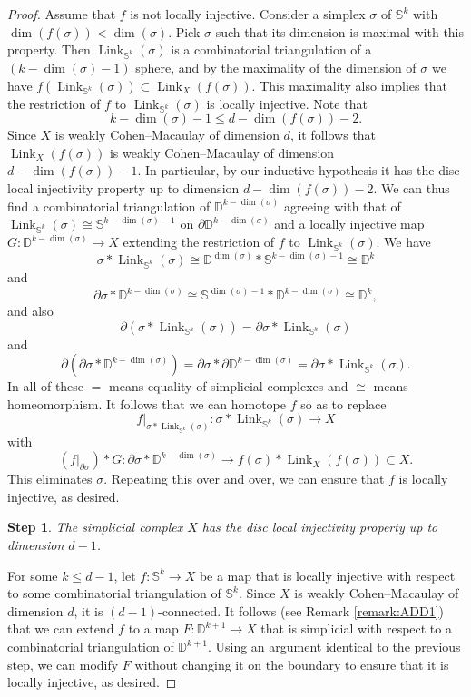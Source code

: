 \documentclass[11pt]{amsart}
\numberwithin{equation}{section}
\theoremstyle{plain}
\newtheorem{stepsb}{Step}
\theoremstyle{definition}
\theoremstyle{remark}
\newcommand\bbD{\ensuremath{\mathbb{D}}}
\newcommand\bbS{\ensuremath{\mathbb{S}}}
\DeclareMathOperator{\Link}{Link}
\begin{document}
\begin{proof}
Assume that $f$ is not locally injective.
Consider a simplex $\sigma$ of $\bbS^k$ with $\dim(f(\sigma)) < \dim(\sigma)$.  Pick $\sigma$ such that its dimension is maximal
with this property.  Then $\Link_{\bbS^k}(\sigma)$ is a combinatorial
triangulation of a $(k-\dim(\sigma)-1)$ sphere, and by the maximality of the dimension of $\sigma$ we have
$f(\Link_{\bbS^k}(\sigma)) \subset \Link_X(f(\sigma))$.  This maximality also implies that the restriction
of $f$ to $\Link_{\bbS^k}(\sigma)$ is locally injective.  Note that
\[k-\dim(\sigma)-1 \leq d - \dim(f(\sigma)) - 2.\]
Since $X$ is weakly Cohen--Macaulay of dimension $d$, it follows that $\Link_X(f(\sigma))$ is weakly
Cohen--Macaulay of dimension $d-\dim(f(\sigma))-1$.  In particular, by our inductive hypothesis
it has the disc local injectivity property up to dimension $d-\dim(f(\sigma))-2$.  We can thus
find a combinatorial triangulation of $\bbD^{k-\dim(\sigma)}$ agreeing with that of $\Link_{\bbS^k}(\sigma) \cong \bbS^{k-\dim(\sigma)-1}$ on
$\partial \bbD^{k-\dim(\sigma)}$ and a locally injective map $G\colon \bbD^{k-\dim(\sigma)} \rightarrow X$
extending the restriction of $f$ to $\Link_{\bbS^k}(\sigma)$.  We have
\[\sigma \ast \Link_{\bbS^k}\left(\sigma\right) \cong \bbD^{\dim(\sigma)} \ast \bbS^{k-\dim(\sigma)-1} \cong \bbD^k\]
and
\[\partial \sigma \ast \bbD^{k-\dim(\sigma)} \cong \bbS^{\dim(\sigma)-1} \ast \bbD^{k-\dim(\sigma)} \cong \bbD^k,\]
and also
\[\partial\left(\sigma \ast \Link_{\bbS^k}\left(\sigma\right)\right) = \partial \sigma \ast \Link_{\bbS^k}\left(\sigma\right)\]
and
\[\partial\left(\partial \sigma \ast \bbD^{k-\dim(\sigma)}\right) = \partial \sigma \ast \partial \bbD^{k-\dim(\sigma)} = \partial \sigma \ast \Link_{\bbS^k}(\sigma).\]
In all of these $=$ means equality of simplicial complexes and $\cong$ means homeomorphism.  It follows that we can homotope
$f$ so as to replace
\[f|_{\sigma \ast \Link_{\bbS^k}(\sigma)} \colon \sigma \ast \Link_{\bbS^k}(\sigma) \rightarrow X\]
with
\[\left(f|_{\partial \sigma}\right) \ast G \colon \partial \sigma \ast \bbD^{k-\dim(\sigma)} \rightarrow f(\sigma) \ast \Link_X(f(\sigma)) \subset X.\]
This eliminates $\sigma$. 
Repeating this over and over, we can ensure that $f$ is locally injective, as desired.

\begin{stepsb}
The simplicial complex $X$ has the disc local injectivity property up to dimension $d-1$.
\end{stepsb}

For some $k \leq d-1$, let $f\colon \bbS^k \rightarrow X$ be a map that is locally injective with respect
to some combinatorial triangulation of $\bbS^k$.  Since $X$ is weakly Cohen--Macaulay of dimension $d$, it
is $(d-1)$-connected.  It follows (see Remark \ref{remark:ADD1}) 
that we can extend $f$ to a map $F\colon \bbD^{k+1} \rightarrow X$ that
is simplicial with respect to a combinatorial triangulation of $\bbD^{k+1}$.  Using an argument identical
to the previous step, we can modify $F$ without changing it on the boundary to ensure that it is locally
injective, as desired.
\end{proof}
\end{document}
